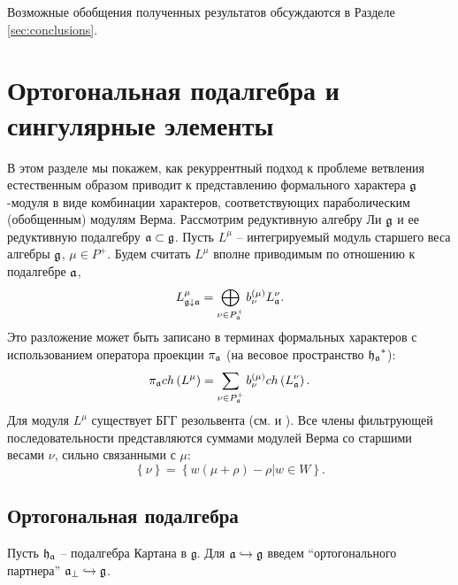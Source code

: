 Возможные обобщения полученных результатов обсуждаются в Разделе \ref{sec:conclusions}.

\section{Ортогональная подалгебра и сингулярные элементы}

\label{sec:recurr-form-branch}

В этом разделе мы покажем, как рекуррентный подход к проблеме ветвления естественным образом приводит к представлению формального характера $\frak{g}$-модуля в виде комбинации характеров, соответствующих параболическим (обобщенным) модулям Верма. Рассмотрим редуктивную алгебру Ли  $\frak{g}$ и ее редуктивную подалгебру $\frak{a}\subset \frak{g}$.
Пусть  $L^{\mu} $ -- интегрируемый модуль старшего веса алгебры  $\frak{g}$, $\mu \in P^{+}$.  Будем считать  $L^{\mu}$ вполне приводимым по отношению к подалгебре $\frak{a}$,
\begin{equation*}
L_{\frak{g}\downarrow \frak{a}}^{\mu }=\bigoplus\limits_{\nu \in P_{\frak{a}%
}^{+}}b_{\nu }^{\left( \mu \right) }L_{\frak{a}}^{\nu }.
\end{equation*}
Это разложение может быть записано в терминах формальных характеров с использованием оператора проекции  $\pi _{\frak{a}}$ (на весовое пространство $\frak{h_{a}}^{\ast }$):
\begin{equation}
\pi _{\frak{a}}ch\left( L^{\mu }\right) =\sum_{\nu \in P_{\frak{a}%
}^{+}}b_{\nu }^{(\mu )}ch\left( L_{\frak{a}}^{\nu }\right) .
\label{branching1}
\end{equation}
Для модуля  $L^{\mu }$ существует БГГ резольвента (см. \cite
{bernstein1976category,bernstein1975differential,bernstein1971structure} и
\cite{humphreys2008representations}). Все члены фильтрующей последовательности представляются суммами модулей Верма со старшими весами $\nu$, сильно связанными с $\mu$:
\begin{equation*}
\left\{ \nu \right\} =\left\{ w\left( \mu +\rho \right) -\rho |w\in
W\right\} .
\end{equation*}

\subsection{Ортогональная подалгебра}

Пусть  $\frak{h}_{\frak{a}}$ -- подалгебра Картана в  $\mathfrak{g}$. Для  $\mathfrak{a}\hookrightarrow \frak{g}$ введем ``ортогонального партнера''  $\mathfrak{a}_{\bot }\hookrightarrow \frak{g}$.


